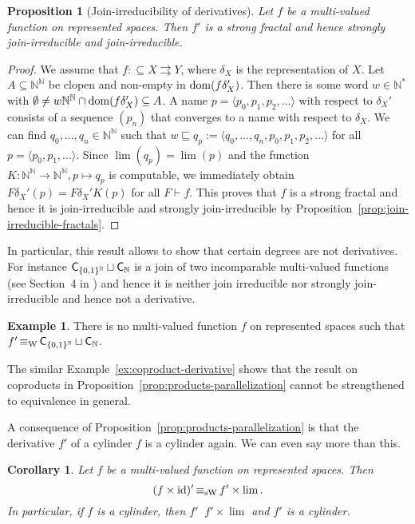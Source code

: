 \documentclass[a4paper]{amsart}
\def\IN{{\mathbb{N}}}
\def\In{\subseteq}
\def\prefix{\sqsubseteq}
\def\mto{\rightrightarrows}
\def\id{{\rm id}}
\def\dom{{\rm dom}}
\def\Cantor{{\{0,1\}^\IN}}
\def\C{\mbox{\rm\sffamily C}}
\def\equivW{\mathop{\equiv_{\mathrm{W}}}}
\def\equivSW{\mathop{\equiv_{\mathrm{sW}}}}
\newtheorem{proposition}[theorem]{Proposition}
\newtheorem{corollary}[theorem]{Corollary}
\theoremstyle{definition}
\newtheorem{example}[theorem]{Example}
\begin{document}
\begin{proposition}[Join-irreducibility of derivatives]
\label{prop:join-irreducibility}
Let $f$ be a multi-valued function on represented spaces. 
Then $f'$ is a strong fractal and hence strongly join-irreducible and join-irreducible.
\end{proposition}
\begin{proof}
We assume that $f:\In X\mto Y$, where $\delta_X$ is the representation of $X$.
Let $A\In\IN^\IN$ be clopen and non-empty in $\dom(f\delta_X')$.
Then there is some word $w\in\IN^*$ with $\emptyset\not=w\IN^\IN\cap\dom(f\delta_X')\In A$. A name $p=\langle p_0,p_1,p_2,...\rangle$
with respect to $\delta_X'$ consists of a sequence $(p_n)$ that converges to a name with respect to $\delta_X$. We can find $q_0,...,q_n\in\IN^\IN$ such that
$w\prefix q_p:=\langle q_0,...,q_n,p_0,p_1,p_2,...\rangle$ for all $p=\langle p_0,p_1,...\rangle$. Since $\lim(q_p)=\lim(p)$ and the function
$K:\IN^\IN\to\IN^\IN,p\mapsto q_p$ is computable, 
we immediately obtain $F\delta_X'(p)=F\delta_X'K(p)$ for all $F\vdash f$.
This proves that $f$ is a strong fractal and hence it is join-irreducible and strongly join-irreducible
by Proposition~\ref{prop:join-irreducible-fractals}.
\end{proof}

In particular, this result allows to show that certain degrees are not derivatives.
For instance $\C_\Cantor\sqcup\C_\IN$ is a join of two incomparable multi-valued functions (see Section~4 in \cite{BG11})
and hence it is neither join irreducible nor strongly join-irreducible and hence not a derivative. 

\begin{example}
\label{ex:no-derivative}
There is no multi-valued function $f$ on represented spaces such that $f'\equivW\C_\Cantor\sqcup\C_\IN$.
\end{example}

The similar Example~\ref{ex:coproduct-derivative} shows 
that the result on coproducts in Proposition~\ref{prop:products-parallelization} cannot be strengthened to equivalence in general.

A consequence of Proposition~\ref{prop:products-parallelization} 
is that the derivative $f'$ of a 
cylinder $f$ is a cylinder again. We can even say more than this.

\begin{corollary}
\label{cor:cylinder}
Let $f$ be a multi-valued function on represented spaces. Then
\[(f\times\id)'\equivSW f'\times\lim.\]
In particular, if $f$ is a cylinder, then $f'\equivSW f'\times\lim$ and $f'$ is a cylinder.
\end{corollary}
\end{document}
